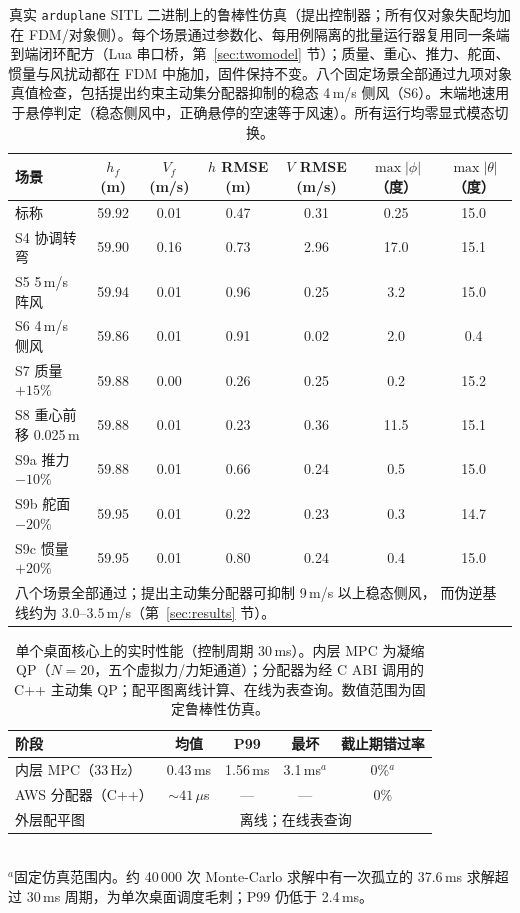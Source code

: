 \documentclass[UTF8,a4paper,11pt]{ctexart}
\begin{document}
\begin{table}[t]
\centering
\caption{真实 \texttt{arduplane} SITL 二进制上的鲁棒性仿真（提出控制器；所有仅对象失配均加在 FDM/对象侧）。每个场景通过参数化、每用例隔离的批量运行器复用同一条端到端闭环配方（Lua 串口桥，第~\ref{sec:twomodel} 节）；质量、重心、推力、舵面、惯量与风扰动都在 FDM 中施加，固件保持不变。八个固定场景全部通过九项对象真值检查，包括提出约束主动集分配器抑制的稳态 4\,m/s 侧风（S6）。末端地速用于悬停判定（稳态侧风中，正确悬停的空速等于风速）。所有运行均零显式模态切换。}
\label{tab:robust}
\small
\begin{tabular}{lcccccc}
\toprule
场景 & $h_f$ (m) & $V_f$ (m/s) & $h$ RMSE (m) & $V$ RMSE (m/s) & $\max|\phi|$（度） & $\max|\theta|$（度） \\
\midrule
标称            & 59.92 & 0.01 & 0.47 & 0.31 & 0.25 & 15.0 \\
S4 协调转弯 & 59.90 & 0.16 & 0.73 & 2.96 & 17.0 & 15.1 \\
S5 5\,m/s 阵风      & 59.94 & 0.01 & 0.96 & 0.25 & 3.2 & 15.0 \\
S6 4\,m/s 侧风 & 59.86 & 0.01 & 0.91 & 0.02 & 2.0 & 0.4 \\
S7 质量 $+15\%$     & 59.88 & 0.00 & 0.26 & 0.25 & 0.2 & 15.2 \\
S8 重心前移 0.025\,m & 59.88 & 0.01 & 0.23 & 0.36 & 11.5 & 15.1 \\
S9a 推力 $-10\%$  & 59.88 & 0.01 & 0.66 & 0.24 & 0.5 & 15.0 \\
S9b 舵面 $-20\%$ & 59.95 & 0.01 & 0.22 & 0.23 & 0.3 & 14.7 \\
S9c 惯量 $+20\%$ & 59.95 & 0.01 & 0.80 & 0.24 & 0.4 & 15.0 \\
\midrule
\multicolumn{7}{l}{\footnotesize 八个场景全部通过；提出主动集分配器可抑制 9\,m/s 以上稳态侧风，
而伪逆基线约为 $3.0$--$3.5$\,m/s（第~\ref{sec:results} 节）。}\\
\bottomrule
\end{tabular}
\end{table}

\begin{table}[t]
\centering
\caption{单个桌面核心上的实时性能（控制周期 30\,ms）。内层 MPC 为凝缩 QP（$N=20$，五个虚拟力/力矩通道）；分配器为经 C ABI 调用的 C++ 主动集 QP；配平图离线计算、在线为表查询。数值范围为固定鲁棒性仿真。}
\label{tab:rt}
\small
\begin{tabular}{lcccc}
\toprule
阶段 & 均值 & P99 & 最坏 & 截止期错过率 \\
\midrule
内层 MPC（33\,Hz） & 0.43\,ms & 1.56\,ms & 3.1\,ms$^{a}$ & 0\%$^{a}$ \\
AWS 分配器（C++） & $\sim 41\,\mu$s & --- & --- & 0\% \\
外层配平图 & \multicolumn{4}{c}{离线；在线表查询} \\
\bottomrule
\end{tabular}\\[2pt]
\footnotesize $^{a}$固定仿真范围内。约 40\,000 次 Monte-Carlo 求解中有一次孤立的 37.6\,ms 求解超过 30\,ms 周期，为单次桌面调度毛刺；P99 仍低于 2.4\,ms。
\end{table}
\end{document}
